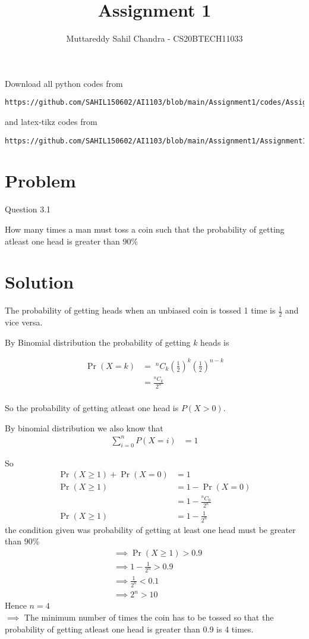 \documentclass[journal,12pt,twocolumn]{IEEEtran}
\begin{document}
\title{Assignment 1}
\author{Muttareddy Sahil Chandra - CS20BTECH11033}
\maketitle
\newpage
\bigskip
\renewcommand{\thefigure}{\theenumi}
\renewcommand{\thetable}{\theenumi}
Download all python codes from 
\begin{lstlisting}
https://github.com/SAHIL150602/AI1103/blob/main/Assignment1/codes/Assignment.py
\end{lstlisting}
%
and latex-tikz codes from 
%
\begin{lstlisting}
https://github.com/SAHIL150602/AI1103/blob/main/Assignment1/Assignment1.tex
\end{lstlisting}
\section{Problem}
Question 3.1

How many times a man must toss a coin such that the probability of getting atleast one head is greater than $90\%$
\section{Solution} 
The probability of getting heads when an unbiased coin is tossed 1 time  is {\large$\frac{1}{2}$}  and  vice versa.
  
  By Binomial distribution the probability of getting $k$ heads is
  
      \begin{align}
        \Pr(X = k) & =\;^nC_k\left(\frac{1}{2}\right)^k\left(\frac{1}{2}\right)^{n-k}\\  
        & =\frac{^nC_k}{2^n}\\  
      \end{align}
  
     
  So the probability of getting atleast one head is $P(X>0) $.
  
  By binomial distribution we also know that
  \begin{align}
      \sum_{i=0}^{n}P(X=i) &= 1
  \end{align}
  
  So    
  \begin{align}
      \Pr(X\ge 1) + \Pr(X=0) &= 1\\
      \Pr(X\ge 1) &= 1 - \Pr(X=0)\\
      &= 1 - \frac{^nC_0}{2^n}\\
      \Pr(X\ge 1) &= 1 - \frac{1}{2^n}
  \end{align}
  the condition given was probability of getting at least one head must be greater than  $90\%$
 \begin{align}
      &\implies \Pr(X\ge 1)>0.9\\
      &\implies 1-\frac{1}{2^n}>0.9\\
      &\implies\frac{1}{2^n}<0.1\\
      &\implies 2^n>10
  \end{align}
  Hence $n =4$\\
$\implies$ The minimum number of times the coin has to be tossed so that the probability  of getting atleast one head is greater than 0.9 is 4 times.    
\end{document}
